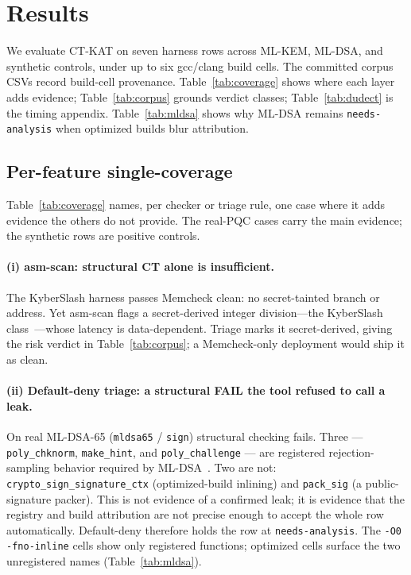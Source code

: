 \section{Results}
\label{sec:results}

We evaluate CT-KAT on seven harness rows across ML-KEM, ML-DSA, and synthetic
controls, under up to six gcc/clang build cells. The committed corpus CSVs record
build-cell provenance. Table~\ref{tab:coverage} shows where each layer adds
evidence; Table~\ref{tab:corpus} grounds verdict classes; Table~\ref{tab:dudect}
is the timing appendix. Table~\ref{tab:mldsa} shows why ML-DSA remains
\texttt{needs-analysis} when optimized builds blur attribution.

\subsection{Per-feature single-coverage}
\label{sec:results-coverage}

Table~\ref{tab:coverage} names, per checker or triage rule, one case where it
adds evidence the others do not provide. The real-PQC cases carry the main
evidence; the synthetic rows are positive controls.

\paragraph{(i) asm-scan: structural CT alone is insufficient.}
The KyberSlash harness passes Memcheck clean: no secret-tainted branch or
address. Yet asm-scan flags a
secret-derived integer division---the KyberSlash class~\cite{kyberslash}---whose
latency is data-dependent. Triage marks it secret-derived, giving
the risk verdict in Table~\ref{tab:corpus}; a Memcheck-only deployment would
ship it as clean.

\paragraph{(ii) Default-deny triage: a structural FAIL the tool refused to
call a leak.}
On real ML-DSA-65 (\texttt{mldsa65} / \texttt{sign}) structural checking fails.
Three --- \texttt{poly\_chknorm}, \texttt{make\_hint}, and
\texttt{poly\_challenge} --- are registered rejection-sampling behavior required
by ML-DSA~\cite{fips204,dilithium}. Two are not:
\texttt{crypto\_sign\_signature\_ctx} (optimized-build inlining) and
\texttt{pack\_sig} (a public-signature packer). This is not evidence of a
confirmed leak; it is evidence that the registry and build attribution are not
precise enough to accept the whole row automatically. Default-deny therefore
holds the row at \texttt{needs-analysis}. The \texttt{-O0 -fno-inline} cells show
only registered functions; optimized cells surface the two unregistered names
(Table~\ref{tab:mldsa}).

